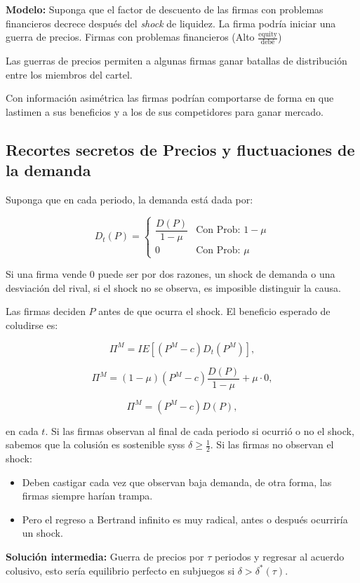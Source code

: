 \documentclass[letterpaper,12pt,twocolumn]{report}
\begin{document}
\textbf{Modelo:} Suponga que el factor de descuento de las firmas con problemas financieros decrece después del \textit{shock} de liquidez. La firma podría iniciar una guerra de precios. Firmas con problemas financieros (Alto $\frac{\text{equity}}{\text{debé}}$)

Las guerras de precios permiten a algunas firmas ganar batallas de distribución entre los miembros del cartel.

Con información asimétrica las firmas podrían comportarse de forma en que lastimen a sus beneficios y a los de sus competidores para ganar mercado.

\subsection*{Recortes secretos de Precios y fluctuaciones de la demanda}

Suponga que en cada periodo, la demanda está dada por:

$$ D_t(P)= \begin{cases}
	\dfrac{D(P)}{1-\mu} & \text{Con Prob: } 1-\mu\\ 
	0 & \text{Con Prob: } \mu
\end{cases} $$

Si una firma vende $0$ puede ser por dos razones, un shock de demanda o una desviación del rival, si el shock no se observa, es imposible distinguir la causa. 

Las firmas deciden $P$ antes de que ocurra el shock. El beneficio esperado de coludirse es:

$$ \Pi^M= IE[(P^M-c)D_t(P^M)] ,$$

$$ \Pi^M=(1-\mu)(P^M-c)\dfrac{D(P)}{1-\mu}+\mu \cdot 0,$$

$$\Pi^M= (P^M-c)D(P),$$

en cada $t$. Si las firmas observan al final de cada periodo si ocurrió o no el shock, sabemos que la colusión es sostenible syss $\delta \geq \frac{1}{2}$. Si las firmas no observan el shock:

\begin{itemize}
	\item Deben castigar cada vez que observan baja demanda, de otra forma, las firmas siempre harían trampa.
	\item Pero el regreso a Bertrand infinito es muy radical, antes o después ocurriría un shock.
\end{itemize}

\textbf{Solución intermedia:} Guerra de precios por $\tau$ periodos y regresar al acuerdo colusivo, esto sería equilibrio perfecto en subjuegos si $\delta >\delta^*(\tau)$.
\end{document}
